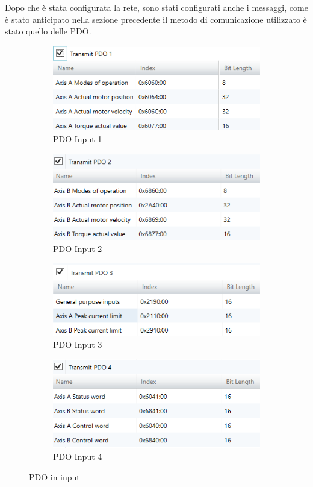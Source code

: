 Dopo che è stata configurata la rete, sono stati configurati anche i messaggi, come è stato anticipato nella sezione precedente il metodo di comunicazione utilizzato è stato quello delle PDO. 
\begin{figure}[!ht]
\begin{subfigure}{.5\textwidth}
  \centering
  \includegraphics[width=.8\linewidth]{Immagini/Sperimentale/pdo1in.png}  
  \caption{PDO Input 1}
  \label{fig:sub-firstpdo}
\end{subfigure}
\begin{subfigure}{.5\textwidth}
  \centering
  \includegraphics[width=.8\linewidth]{Immagini/Sperimentale/pdo2in.png}  
  \caption{PDO Input 2}
  \label{fig:sub-secondpdo}
\end{subfigure}
\begin{subfigure}{.5\textwidth}
  \centering
  \includegraphics[width=.8\linewidth]{Immagini/Sperimentale/pdo3in.png}  
  \caption{PDO Input 3}
  \label{fig:sub-thirdpdo}
\end{subfigure}
\begin{subfigure}{.5\textwidth}
  \centering
  \includegraphics[width=.8\linewidth]{Immagini/Sperimentale/pdo4in.png}  
  \caption{PDO Input 4}
  \label{fig:sub-fourthpdo}
\end{subfigure}
\caption{PDO in input}
\end{figure}
